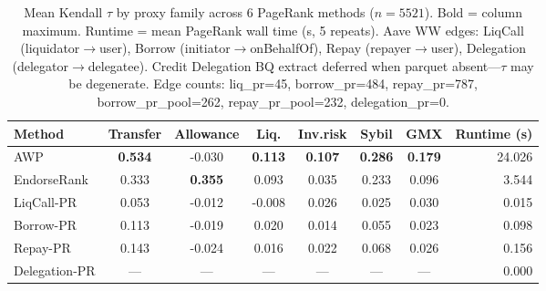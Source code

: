 
\begin{table}[htbp]
\centering
\caption{Mean Kendall $\tau$ by proxy family across 6 PageRank methods ($n=5521$). Bold = column maximum. Runtime = mean PageRank wall time (s, 5 repeats). Aave W\textrightarrow W edges: LiqCall (liquidator$\rightarrow$user), Borrow (initiator$\rightarrow$onBehalfOf), Repay (repayer$\rightarrow$user), Delegation (delegator$\rightarrow$delegatee). Credit Delegation BQ extract deferred when parquet absent---$\tau$ may be degenerate. Edge counts: liq_pr=45, borrow_pr=484, repay_pr=787, borrow_pr_pool=262, repay_pr_pool=232, delegation_pr=0.}
\label{tab:alignment-six-aave-methods}
\begin{tabular}{lccccccr}
\toprule
Method & Transfer & Allowance & Liq. & Inv.risk & Sybil & GMX & Runtime (s) \\
\midrule
AWP & \textbf{0.534} & -0.030 & \textbf{0.113} & \textbf{0.107} & \textbf{0.286} & \textbf{0.179} & 24.026 \\
EndorseRank & 0.333 & \textbf{0.355} & 0.093 & 0.035 & 0.233 & 0.096 & 3.544 \\
LiqCall-PR & 0.053 & -0.012 & -0.008 & 0.026 & 0.025 & 0.030 & 0.015 \\
Borrow-PR & 0.113 & -0.019 & 0.020 & 0.014 & 0.055 & 0.023 & 0.098 \\
Repay-PR & 0.143 & -0.024 & 0.016 & 0.022 & 0.068 & 0.026 & 0.156 \\
Delegation-PR & --- & --- & --- & --- & --- & --- & 0.000 \\
\bottomrule
\end{tabular}
\end{table}
